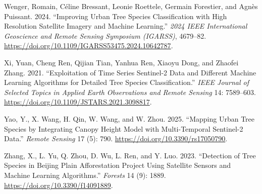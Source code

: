 \documentclass[11pt,a4paper]{scrartcl}
\begin{document}
\begin{CSLReferences}{1}{1}
Wenger, Romain, Céline Bressant, Leonie Roettele, Germain Forestier, and
Agnès Puissant. 2024. {``Improving Urban Tree Species Classification
with High Resolution Satellite Imagery and Machine Learning.''}
\emph{2024 IEEE International Geoscience and Remote Sensing Symposium
(IGARSS)}, 4679--82.
\url{https://doi.org/10.1109/IGARSS53475.2024.10642787}.

Xi, Yuan, Cheng Ren, Qijian Tian, Yanhua Ren, Xiaoyu Dong, and Zhaofei
Zhang. 2021. {``Exploitation of Time Series Sentinel-2 Data and
Different Machine Learning Algorithms for Detailed Tree Species
Classification.''} \emph{IEEE Journal of Selected Topics in Applied
Earth Observations and Remote Sensing} 14: 7589--603.
\url{https://doi.org/10.1109/JSTARS.2021.3098817}.

Yao, Y., X. Wang, H. Qin, W. Wang, and W. Zhou. 2025. {``Mapping Urban
Tree Species by Integrating Canopy Height Model with Multi-Temporal
Sentinel-2 Data.''} \emph{Remote Sensing} 17 (5): 790.
\url{https://doi.org/10.3390/rs17050790}.

Zhang, X., L. Yu, Q. Zhou, D. Wu, L. Ren, and Y. Luo. 2023. {``Detection
of Tree Species in Beijing Plain Afforestation Project Using Satellite
Sensors and Machine Learning Algorithms.''} \emph{Forests} 14 (9): 1889.
\url{https://doi.org/10.3390/f14091889}.

\end{CSLReferences}
\end{document}
